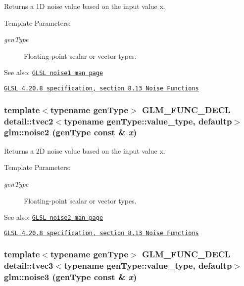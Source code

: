 Returns a 1D noise value based on the input value x.

\begin{Desc}
\item[Template Parameters:]
\begin{description}
\item[{\em genType}]Floating-point scalar or vector types.\end{description}
\end{Desc}
\begin{Desc}
\item[See also:]\href{http://www.opengl.org/sdk/docs/manglsl/xhtml/noise1.xml}{\tt GLSL noise1 man page} 

\href{http://www.opengl.org/registry/doc/GLSLangSpec.4.20.8.pdf}{\tt GLSL 4.20.8 specification, section 8.13 Noise Functions} \end{Desc}
\hypertarget{group__core__func__noise_gb56ac2b6d1f0353dab3119c1d741f319}{
\subsubsection[noise2]{\setlength{\rightskip}{0pt plus 5cm}template$<$typename genType$>$ GLM\_\-FUNC\_\-DECL detail::tvec2$<$typename genType::value\_\-type, defaultp$>$ glm::noise2 (genType const \& {\em x})}}
\label{group__core__func__noise_gb56ac2b6d1f0353dab3119c1d741f319}


Returns a 2D noise value based on the input value x.

\begin{Desc}
\item[Template Parameters:]
\begin{description}
\item[{\em genType}]Floating-point scalar or vector types.\end{description}
\end{Desc}
\begin{Desc}
\item[See also:]\href{http://www.opengl.org/sdk/docs/manglsl/xhtml/noise2.xml}{\tt GLSL noise2 man page} 

\href{http://www.opengl.org/registry/doc/GLSLangSpec.4.20.8.pdf}{\tt GLSL 4.20.8 specification, section 8.13 Noise Functions} \end{Desc}
\hypertarget{group__core__func__noise_gbdb9942a4dae6ea82bf5a801aa376979}{
\subsubsection[noise3]{\setlength{\rightskip}{0pt plus 5cm}template$<$typename genType$>$ GLM\_\-FUNC\_\-DECL detail::tvec3$<$typename genType::value\_\-type, defaultp$>$ glm::noise3 (genType const \& {\em x})}}
\label{group__core__func__noise_gbdb9942a4dae6ea82bf5a801aa376979}



